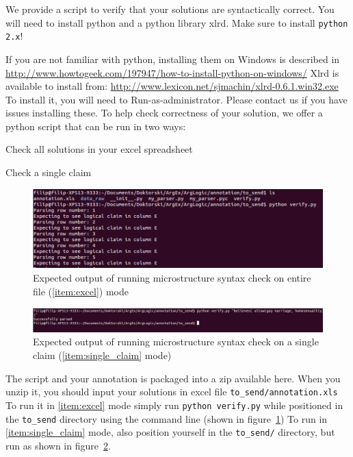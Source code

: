 We provide a script to verify that your solutions are syntactically correct. 
You will need to install python and a python library xlrd. Make sure to install
\texttt{python 2.x}!

If you are not familiar with python, installing them on Windows is described in
\url{http://www.howtogeek.com/197947/how-to-install-python-on-windows/}
Xlrd is available to install from:
\url{http://www.lexicon.net/sjmachin/xlrd-0.6.1.win32.exe} 
To install it, you will need to Run-as-administrator. 
Please contact us if you have issues installing these. 
To help check correctness of your solution, we offer a python script that can
be run in two ways:

\begin{description}[style=multiline, labelwidth=1.5cm]
\item[\namedlabel{item:excel}{All}] Check all solutions in your excel spreadsheet
\item[\namedlabel{item:single_claim}{Single}] Check a single claim
\end{description}

\begin{figure}
	\includegraphics[scale=0.5]{struc_instructions_1.png}
	\caption{Expected output of running microstructure syntax check on entire file (\ref{item:excel}) mode}
	\label{fig:struc_instructions_all}
\end{figure}

\begin{figure}
\includegraphics[scale=0.35]{struc_instructions_2.png}
	\caption{Expected output of running microstructure syntax check on a
	\label{fig:struc_instructions_2}
	single claim (\ref{item:single_claim} mode) }
\end{figure}

\noindent The script and your annotation is packaged into a zip available here. When you
unzip it, you should input your solutions in excel file \texttt{to\_send/annotation.xls}
To run it in \ref{item:excel} mode simply run \texttt{python verify.py} while
positioned in the \texttt{to\_send} directory using the command line (shown in
figure~\ref{fig:struc_instructions_all}) To run in \ref{item:single_claim}
mode, also position yourself in the \texttt{to\_send/} directory, but run as
shown in figure~\ref{fig:struc_instructions_2}.
